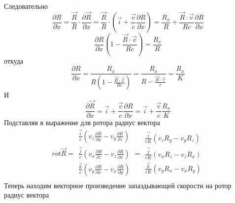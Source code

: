\documentclass[11pt]{article}
\begin{document}
Следовательно
\[\frac{\partial R}{\partial x}=\frac{\overrightarrow{R}}{R}\cdot \frac{\partial \overrightarrow{R}}{\partial x}=\frac{\overrightarrow{R}}{R}\cdot \left( \overrightarrow{i}+\frac{\overrightarrow{v}}{c}\frac{\partial R}{\partial x} \right)=\frac{{{R}_{x}}}{R}+\frac{\overrightarrow{R}\cdot \overrightarrow{v}}{Rc}\frac{\partial R}{\partial x}\]
\[\frac{\partial R}{\partial x}\left( 1-\frac{\overrightarrow{R}\cdot \overrightarrow{v}}{Rc} \right)=\frac{{{R}_{x}}}{R}\]
откуда
\[\frac{\partial R}{\partial x}=\frac{{{R}_{x}}}{R\left( 1-\frac{\overrightarrow{R}\cdot \overrightarrow{v}}{Rc} \right)}=\frac{{{R}_{x}}}{R-\frac{\overrightarrow{R}\cdot \overrightarrow{v}}{c}}=\frac{{{R}_{x}}}{K}\]
И
\[\frac{\partial \overrightarrow{R}}{\partial x}=\overrightarrow{i}+\frac{\overrightarrow{v}}{c}\frac{\partial R}{\partial x}=\overrightarrow{i}+\frac{\overrightarrow{v}}{c}\frac{{{R}_{x}}}{K}\]
Подставляя в выражение для ротора радиус вектора
\[rot\overrightarrow{R}=\begin{matrix}
   \frac{\overrightarrow{i}}{c}\left( {{v}_{z}}\frac{\partial R}{\partial y}-{{v}_{y}}\frac{\partial R}{\partial z} \right)  \\
   \frac{\overrightarrow{j}}{c}\left( {{v}_{x}}\frac{\partial R}{\partial z}-{{v}_{z}}\frac{\partial R}{\partial x} \right)  \\
   \frac{\overrightarrow{k}}{c}\left( {{v}_{y}}\frac{\partial R}{\partial x}-{{v}_{x}}\frac{\partial R}{\partial y} \right)  \\
\end{matrix}=\begin{matrix}
   \frac{\overrightarrow{i}}{cK}\left( {{v}_{z}}{{R}_{y}}-{{v}_{y}}{{R}_{z}} \right)  \\
   \frac{\overrightarrow{j}}{cK}\left( {{v}_{x}}{{R}_{z}}-{{v}_{z}}{{R}_{x}} \right)  \\
   \frac{\overrightarrow{k}}{cK}\left( {{v}_{y}}{{R}_{x}}-{{v}_{x}}{{R}_{y}} \right)  \\
\end{matrix}\] Теперь находим векторное произведение запаздывающей
скорости на ротор радиус вектора
\end{document}
